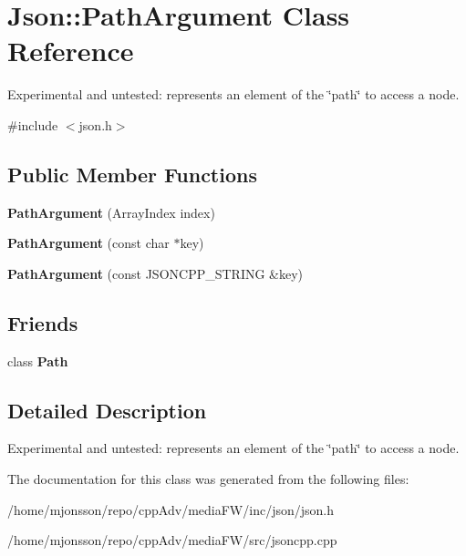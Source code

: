 \hypertarget{classJson_1_1PathArgument}{}\section{Json\+:\+:Path\+Argument Class Reference}
\label{classJson_1_1PathArgument}


Experimental and untested\+: represents an element of the \char`\"{}path\char`\"{} to access a node.  




{\ttfamily \#include $<$json.\+h$>$}

\subsection*{Public Member Functions}
\begin{DoxyCompactItemize}
\item 
\mbox{\label{classJson_1_1PathArgument_a53c5b27143b161301b95fd544c139ecf}} 
{\bfseries Path\+Argument} (Array\+Index index)
\item 
\mbox{\label{classJson_1_1PathArgument_a9690417a8a40e6e49f2acdf6c9281345}} 
{\bfseries Path\+Argument} (const char $\ast$key)
\item 
\mbox{\label{classJson_1_1PathArgument_ac15f25452124fbf21218897113015301}} 
{\bfseries Path\+Argument} (const J\+S\+O\+N\+C\+P\+P\+\_\+\+S\+T\+R\+I\+NG \&key)
\end{DoxyCompactItemize}
\subsection*{Friends}
\begin{DoxyCompactItemize}
\item 
\mbox{\label{classJson_1_1PathArgument_a4877239a6b7f09fbf5a61ca68a49d74c}} 
class {\bfseries Path}
\end{DoxyCompactItemize}


\subsection{Detailed Description}
Experimental and untested\+: represents an element of the \char`\"{}path\char`\"{} to access a node. 

The documentation for this class was generated from the following files\+:\begin{DoxyCompactItemize}
\item 
/home/mjonsson/repo/cpp\+Adv/media\+F\+W/inc/json/json.\+h\item 
/home/mjonsson/repo/cpp\+Adv/media\+F\+W/src/jsoncpp.\+cpp\end{DoxyCompactItemize}
